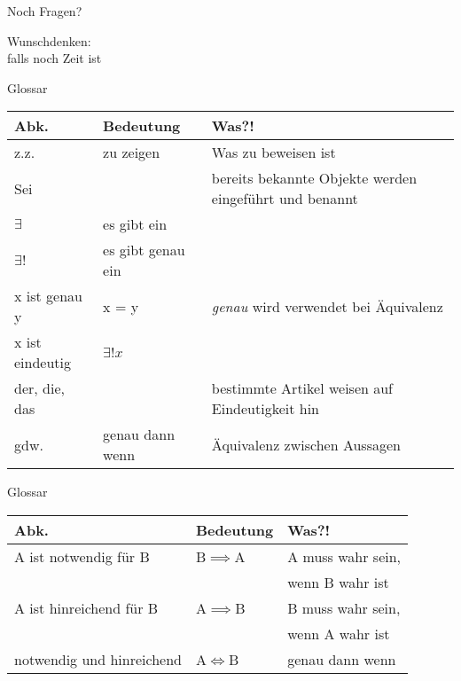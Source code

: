 \begin{frame}[standout]
  Noch Fragen?
\end{frame}

\begin{frame}[standout]
  Wunschdenken:\\falls noch Zeit ist
\end{frame}



 \begin{frame}[fragile]{Glossar}
     \small
     \begin{tabular}{p{} p{} p{}}
     \toprule
     Abk.&Bedeutung&Was?!\\
     \midrule
         z.z. & zu zeigen & Was zu beweisen ist\\
         Sei&&bereits bekannte Objekte werden eingeführt und benannt\\
         $\exists$&es gibt ein&\\
         $\exists !$&es gibt genau ein&\\
         x ist genau y&x = y&\emph{genau} wird verwendet bei Äquivalenz\\
         x ist eindeutig&$\exists ! x$&\\
         der, die, das&&bestimmte Artikel weisen auf Eindeutigkeit hin\\
         gdw.&genau dann wenn&Äquivalenz zwischen Aussagen\\
     \bottomrule
     \end{tabular}
 \end{frame}
\begin{frame}[fragile]{Glossar}
    \small
    \begin{tabular}{p{} p{} p{}}
    \toprule
    Abk.&Bedeutung&Was?!\\
    \midrule
        A ist notwendig für B&B$\implies$A&A muss wahr sein,\\
        &&wenn B wahr ist\\
        A ist hinreichend für B&A$\implies$B&B muss wahr sein,\\
        &&wenn A wahr ist\\
        notwendig und hinreichend&A$\iff$B&genau dann wenn\\
    \bottomrule
    \end{tabular}
\end{frame}

